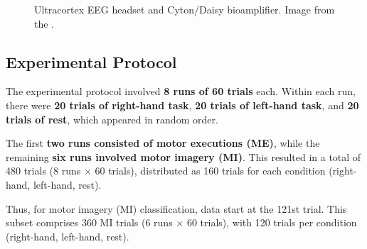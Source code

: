 \documentclass[11pt]{exam}
\begin{document}
\begin{appendices}
        \begin{figure}[htbp]
            \centering
            \caption{Ultracortex EEG headset and Cyton/Daisy bioamplifier. Image from the \href{https://shop.openbci.com/products/the-complete-headset-eeg?variant=44401726193904}{}.}
            \label{fig:OpenBCI}
        \end{figure}

        \subsection{Experimental Protocol}

        The experimental protocol involved \textbf{8 runs of 60 trials} each. Within each run, there were \textbf{20 trials of right-hand task}, \textbf{20 trials of left-hand task}, and \textbf{20 trials of rest}, which appeared in random order.

        The first \textbf{two runs consisted of motor executions (ME)}, while the remaining \textbf{six runs involved motor imagery (MI)}. This resulted in a total of 480 trials (8 runs $\times$ 60 trials), distributed as 160 trials for each condition (right-hand, left-hand, rest).

        Thus, for motor imagery (MI) classification, data start at the 121st trial. This subset comprises 360 MI trials (6 runs $\times$ 60 trials), with 120 trials per condition (right-hand, left-hand, rest).


\end{appendices}
\end{document}
